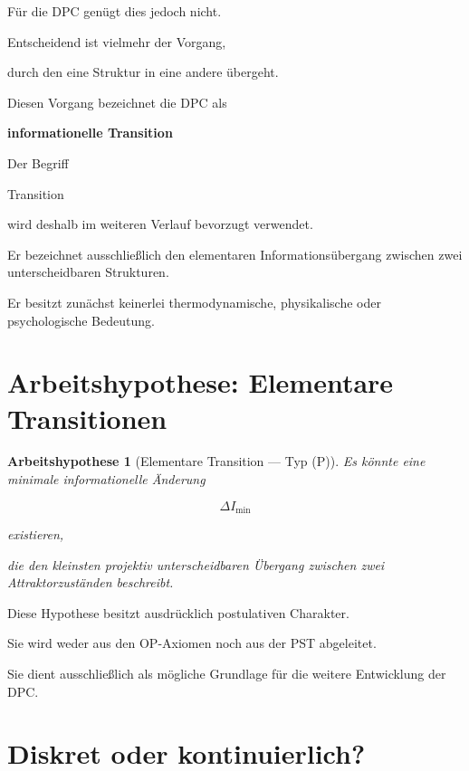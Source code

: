 \documentclass[11pt,a4paper]{article}
\newtheorem{hypothesis}{Arbeitshypothese}
\begin{document}
Für die DPC genügt dies jedoch nicht.

Entscheidend ist vielmehr der Vorgang,

durch den eine Struktur in eine andere übergeht.

Diesen Vorgang bezeichnet die DPC als

\begin{center}

\textbf{informationelle Transition}

\end{center}

Der Begriff

Transition

wird deshalb im weiteren Verlauf bevorzugt verwendet.

Er bezeichnet ausschließlich den elementaren
Informationsübergang zwischen zwei unterscheidbaren
Strukturen.

Er besitzt zunächst keinerlei thermodynamische,
physikalische oder psychologische Bedeutung.

\section{Arbeitshypothese: Elementare Transitionen}

\begin{hypothesis}[Elementare Transition --- Typ (P)]

Es könnte eine minimale informationelle Änderung

\[
\Delta I_{\min}
\]

existieren,

die den kleinsten projektiv unterscheidbaren Übergang
zwischen zwei Attraktorzuständen beschreibt.

\end{hypothesis}

Diese Hypothese besitzt ausdrücklich postulativen
Charakter.

Sie wird weder aus den OP-Axiomen noch aus der PST
abgeleitet.

Sie dient ausschließlich als mögliche Grundlage
für die weitere Entwicklung der DPC.

\section{Diskret oder kontinuierlich?}
\end{document}
